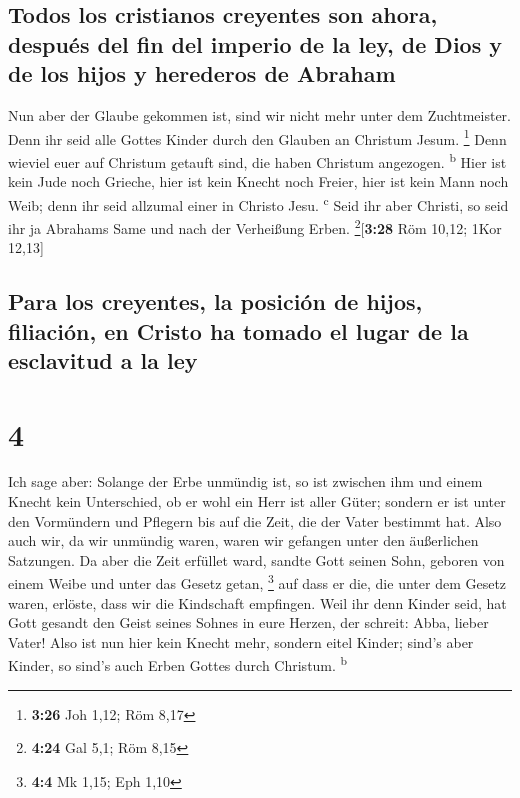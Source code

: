 \hypertarget{todos-los-cristianos-creyentes-son-ahora-despuuxe9s-del-fin-del-imperio-de-la-ley-de-dios-y-de-los-hijos-y-herederos-de-abraham}{%
\subsection{Todos los cristianos creyentes son ahora, después del fin
del imperio de la ley, de Dios y de los hijos y herederos de
Abraham}\label{todos-los-cristianos-creyentes-son-ahora-despuuxe9s-del-fin-del-imperio-de-la-ley-de-dios-y-de-los-hijos-y-herederos-de-abraham}}

 Nun aber der Glaube gekommen ist, sind wir nicht mehr
unter dem Zuchtmeister.  Denn ihr seid alle Gottes Kinder
durch den Glauben an Christum Jesum. \footnote{\textbf{3:26} Joh 1,12;
  Röm 8,17}  Denn wieviel euer auf Christum getauft sind,
die haben Christum angezogen. \textsuperscript{b}  Hier
ist kein Jude noch Grieche, hier ist kein Knecht noch Freier, hier ist
kein Mann noch Weib; denn ihr seid allzumal einer in Christo Jesu.
\textsuperscript{c}  Seid ihr aber Christi, so seid ihr
ja Abrahams Same und nach der Verheißung Erben.
\footnote{\textbf{4:24} Gal 5,1; Röm 8,15}{[}\textbf{3:28} Röm 10,12;
1Kor 12,13{]}

\hypertarget{para-los-creyentes-la-posiciuxf3n-de-hijos-filiaciuxf3n-en-cristo-ha-tomado-el-lugar-de-la-esclavitud-a-la-ley}{%
\subsection{Para los creyentes, la posición de hijos, filiación, en
Cristo ha tomado el lugar de la esclavitud a la
ley}\label{para-los-creyentes-la-posiciuxf3n-de-hijos-filiaciuxf3n-en-cristo-ha-tomado-el-lugar-de-la-esclavitud-a-la-ley}}

\hypertarget{section-3}{%
\section{4}\label{section-3}}

 Ich sage aber: Solange der Erbe unmündig ist, so ist
zwischen ihm und einem Knecht kein Unterschied, ob er wohl ein Herr ist
aller Güter;  sondern er ist unter den Vormündern und
Pflegern bis auf die Zeit, die der Vater bestimmt hat. 
Also auch wir, da wir unmündig waren, waren wir gefangen unter den
äußerlichen Satzungen.  Da aber die Zeit erfüllet ward,
sandte Gott seinen Sohn, geboren von einem Weibe und unter das Gesetz
getan, \footnote{\textbf{4:4} Mk 1,15; Eph 1,10}  auf dass
er die, die unter dem Gesetz waren, erlöste, dass wir die Kindschaft
empfingen.  Weil ihr denn Kinder seid, hat Gott gesandt
den Geist seines Sohnes in eure Herzen, der schreit: Abba, lieber Vater!
 Also ist nun hier kein Knecht mehr, sondern eitel Kinder;
sind's aber Kinder, so sind's auch Erben Gottes durch Christum.
\textsuperscript{b}

